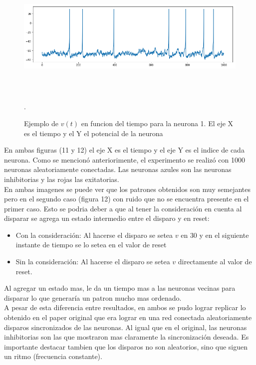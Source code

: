 \documentclass[12pt]{article}
\begin{document}
\begin{figure}[h!]
    \centering
        \includegraphics[height=6cm, width=15cm]{images/ejemploNeurona.png}
    \caption[fontsize=2pt]{Ejemplo de $v(t)$ en funcion del tiempo para la neurona 1. El eje X es el tiempo y el Y el potencial de la neurona}.
\end{figure}

\newpage

En ambas figuras (11 y 12) el eje X es el tiempo y el eje Y es el indice de cada neurona. Como se mencionó anteriorimente, el experimento se realizó con 1000 neuronas aleatoriamente conectadas.
Las neuronas azules son las neuronas inhibitorias y las rojas las exitatorias. \\

En ambas imagenes se puede ver que los patrones obtenidos son muy semejantes pero en el segundo caso (figura 12) con ruido que no se encuentra presente en el primer caso.
Esto se podria deber a que al tener la consideración en cuenta al disparar se agrega un estado intermedio entre el disparo y en reset:
\begin{itemize}
    \item Con la consideración: Al hacerse el disparo se setea $v$ en $30$ y en el siguiente instante de tiempo se lo setea en el valor de reset
    \item Sin la consideración: Al hacerse el disparo se setea $v$ directamente al valor de reset.
\end{itemize}

Al agregar un estado mas, le da un tiempo mas a las neuronas vecinas para disparar lo que generaría un patron mucho mas ordenado. \\

A pesar de esta diferencia entre resultados, en ambos se pudo lograr replicar lo obtenido en el paper original que era lograr en una red conectada aleatoriamente disparos sincronizados de las neuronas.
Al igual que en el original, las neuronas inhibitorias son las que mostraron mas claramente la sincronización deseada. Es importante destacar tambien que los disparos no son aleatorios, sino que siguen un ritmo (frecuencia constante). \\
\end{document}
